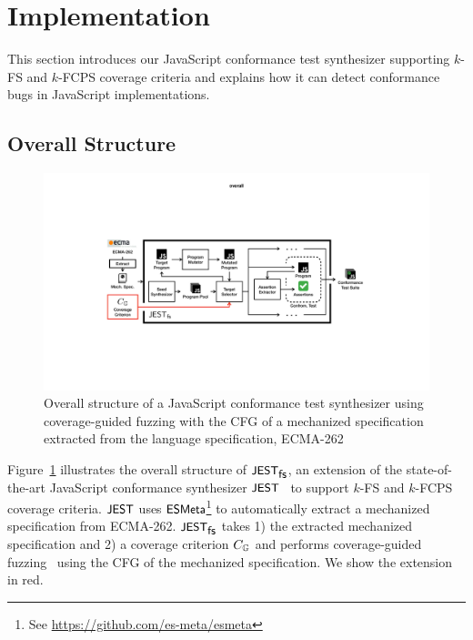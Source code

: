 \section{Implementation}\label{sec:impl}

This section introduces our JavaScript
conformance test synthesizer supporting $k$-FS and $k$-FCPS coverage criteria
and explains how it can detect conformance bugs in JavaScript implementations.


\subsection{Overall Structure}\label{sec:overall}

\begin{figure}
  \includegraphics[width=\textwidth]{img/overall}
  \caption{
    Overall structure of a JavaScript conformance test synthesizer using
    coverage-guided fuzzing with the CFG of a mechanized specification
    extracted from the language specification, ECMA-262
  }
  \label{fig:overall}
\end{figure}

Figure~\ref{fig:overall} illustrates the overall structure of $\textsf{\small JEST}_{\textsf{\small fs}}$,
an extension of the state-of-the-art JavaScript conformance synthesizer $\textsf{\small JEST}$~\cite{jiset}
to support $k$-FS and $k$-FCPS coverage criteria.
$\textsf{\small JEST}$ uses $\textsf{\small ESMeta}$\footnote{
  See \url{https://github.com/es-meta/esmeta}
} to automatically extract a mechanized specification from ECMA-262.
$\textsf{\small JEST}_{\textsf{\small fs}}$ takes 1) the extracted mechanized specification
and 2) a coverage criterion $C_{\mathbb{G}}$ and performs
coverage-guided fuzzing~\cite{afl} using the CFG of the mechanized specification.
We show the extension in red.


